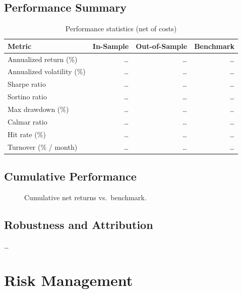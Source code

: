 \documentclass[11pt,letterpaper]{article}
\begin{document}
\subsection{Performance Summary}
\begin{table}[H]
\centering
\caption{Performance statistics (net of costs)}
\begin{tabular}{lrrr}
\toprule
Metric & In-Sample & Out-of-Sample & Benchmark \\
\midrule
Annualized return (\%)    & \dots & \dots & \dots \\
Annualized volatility (\%) & \dots & \dots & \dots \\
Sharpe ratio              & \dots & \dots & \dots \\
Sortino ratio             & \dots & \dots & \dots \\
Max drawdown (\%)         & \dots & \dots & \dots \\
Calmar ratio              & \dots & \dots & \dots \\
Hit rate (\%)             & \dots & \dots & \dots \\
Turnover (\% / month)     & \dots & \dots & \dots \\
\bottomrule
\end{tabular}
\end{table}
 
\subsection{Cumulative Performance}
\begin{figure}[H]
\centering
{}
\caption{Cumulative net returns vs.\ benchmark.}
\end{figure}
 
\subsection{Robustness and Attribution}
\dots
 
\section{Risk Management}
\end{document}
